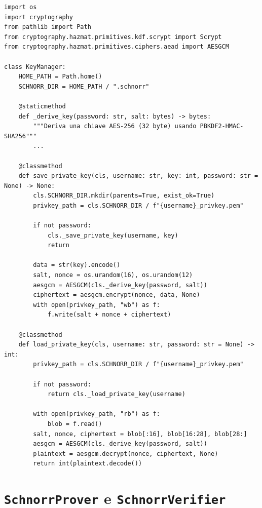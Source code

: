\begin{listing}
\begin{verbatim}
import os
import cryptography
from pathlib import Path
from cryptography.hazmat.primitives.kdf.scrypt import Scrypt
from cryptography.hazmat.primitives.ciphers.aead import AESGCM

class KeyManager:
    HOME_PATH = Path.home()
    SCHNORR_DIR = HOME_PATH / ".schnorr"

    @staticmethod
    def _derive_key(password: str, salt: bytes) -> bytes:
        """Deriva una chiave AES-256 (32 byte) usando PBKDF2-HMAC-SHA256"""
        ...
    
    @classmethod
    def save_private_key(cls, username: str, key: int, password: str = None) -> None:
        cls.SCHNORR_DIR.mkdir(parents=True, exist_ok=True)
        privkey_path = cls.SCHNORR_DIR / f"{username}_privkey.pem"

        if not password:
            cls._save_private_key(username, key)
            return

        data = str(key).encode()
        salt, nonce = os.urandom(16), os.urandom(12)
        aesgcm = AESGCM(cls._derive_key(password, salt))
        ciphertext = aesgcm.encrypt(nonce, data, None)
        with open(privkey_path, "wb") as f:
            f.write(salt + nonce + ciphertext)

    @classmethod
    def load_private_key(cls, username: str, password: str = None) -> int:
        privkey_path = cls.SCHNORR_DIR / f"{username}_privkey.pem"

        if not password:
            return cls._load_private_key(username)

        with open(privkey_path, "rb") as f:
            blob = f.read()
        salt, nonce, ciphertext = blob[:16], blob[16:28], blob[28:]
        aesgcm = AESGCM(cls._derive_key(password, salt))
        plaintext = aesgcm.decrypt(nonce, ciphertext, None)
        return int(plaintext.decode())
\end{verbatim}
\caption{Implementazione della classe \texttt{KeyManager}.}
\end{listing}

\section{\texttt{SchnorrProver} e \texttt{SchnorrVerifier}}
\label{sec:schnorr_classi}

